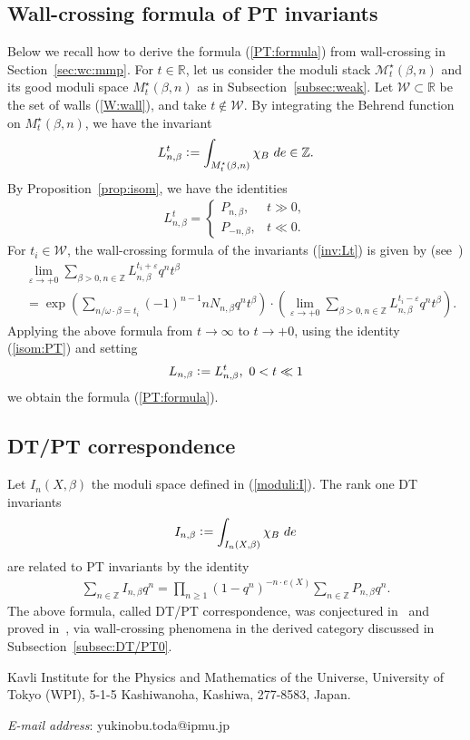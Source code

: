 \documentclass[11pt]{amsart}
\theoremstyle{plain}
\theoremstyle{definition}
\theoremstyle{remark}
\newcommand{\mM}{\mathcal{M}}
\newcommand{\wW}{\mathcal{W}}
\begin{document}
\subsection{Wall-crossing formula of PT invariants}\label{subsection:PT:WCF}
Below we recall how to derive the formula (\ref{PT:formula}) from 
wall-crossing in Section~\ref{sec:wc:mmp}. 
For $t \in \mathbb{R}$, let us consider the 
moduli stack 
$\mM_t^{\star}(\beta, n)$ and its 
good moduli space $M_t^{\star}(\beta, n)$
as in Subsection~\ref{subsec:weak}. 
Let $\wW \subset \mathbb{R}$ be the 
set of walls (\ref{W:wall}), and take $t \notin \wW$. 
By integrating the Behrend function on $M_t^{\star}(\beta, n)$, we have 
the invariant 
\begin{align}\label{inv:Lt}
L_{n, \beta}^{t} \cneq \int_{M_t^{\star}(\beta, n)} \chi_B \ de \in \mathbb{Z}. 
\end{align}
By Proposition~\ref{prop:isom}, 
we have the identities
\begin{align*}
L_{n, \beta}^t=\left\{ \begin{array}{ll}
P_{n, \beta}, & t\gg 0, \\
P_{-n, \beta}, & t \ll 0.
\end{array}
\right. 
\end{align*}
For $t_i \in \wW$, 
the wall-crossing formula 
of the invariants (\ref{inv:Lt}) is given by
(see~\cite[Theorem~5.7]{Tsurvey})
\begin{align*}
&\lim_{\varepsilon \to +0}
\sum_{\beta>0, n\in \mathbb{Z}}
 L_{n, \beta}^{t_i+\varepsilon}
q^n t^{\beta} \\
&=
\exp\left( \sum_{n/\omega \cdot \beta=t_i} 
(-1)^{n-1} n N_{n, \beta} q^n t^{\beta} \right) \cdot 
\left(\lim_{\varepsilon \to +0} 
\sum_{\beta>0, n\in \mathbb{Z}}
L_{n, \beta}^{t_i-\varepsilon}
q^n t^{\beta}\right). 
\end{align*}
Applying the above formula 
from $t\to \infty$ to $t \to +0$, 
using the identity (\ref{isom:PT})
and setting 
\begin{align}\label{def:Linv}
L_{n, \beta} \cneq L_{n, \beta}^t, \ 
0<t \ll 1
\end{align}
we obtain the formula (\ref{PT:formula}). 

\subsection{DT/PT correspondence}\label{subsec:DT/PT}
Let $I_n(X, \beta)$ the moduli space defined in (\ref{moduli:I}). 
The rank one DT invariants
\begin{align*}
I_{n, \beta} \cneq \int_{I_n(X, \beta)} \chi_B \ de
\end{align*}
are related to PT invariants by the identity
\begin{align*}
\sum_{n \in \mathbb{Z}}I_{n, \beta}q^n=
\prod_{n\ge 1}(1-q^n)^{-n \cdot e(X)}
\sum_{n \in \mathbb{Z}}P_{n, \beta}q^n.
\end{align*}
The above formula, called DT/PT correspondence, 
was conjectured in~\cite{PT} and proved in~\cite{BrH, Tcurve1}, 
via wall-crossing phenomena in the derived category
discussed in Subsection~\ref{subsec:DT/PT0}. 






Kavli Institute for the Physics and 
Mathematics of the Universe, University of Tokyo (WPI),
5-1-5 Kashiwanoha, Kashiwa, 277-8583, Japan.


\textit{E-mail address}: yukinobu.toda@ipmu.jp
\end{document}
